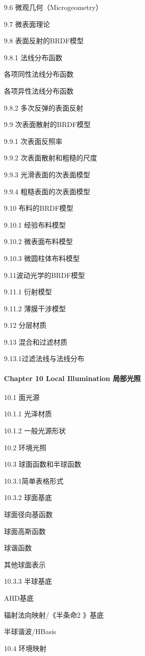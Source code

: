 \documentclass[
  paper=a4,
  ,captions=tableheading
]{scrartcl}
\begin{document}
9.6 微观几何（Microgeometry）

9.7 微表面理论

9.8 表面反射的BRDF模型

9.8.1 法线分布函数

各项同性法线分布函数

各项异性法线分布函数

9.8.2 多次反弹的表面反射

9.9 次表面散射的BRDF模型

9.9.1 次表面反照率

9.9.2 次表面散射和粗糙的尺度

9.9.3 光滑表面的次表面模型

9.9.4 粗糙表面的次表面模型

9.10 布料的BRDF模型

9.10.1 经验布料模型

9.10.2 微表面布料模型

9.10.3 微圆柱体布料模型

9.11波动光学的BRDF模型

9.11.1 衍射模型

9.11.2 薄膜干涉模型

9.12 分层材质

9.13 混合和过滤材质

9.13.1过滤法线与法线分布

\paragraph{Chapter 10 Local Illumination
局部光照}\label{chapter-10-local-illumination-ux5c40ux90e8ux5149ux7167}

10.1 面光源

10.1.1 光泽材质

10.1.2 一般光源形状

10.2 环境光照

10.3 球面函数和半球函数

10.3.1简单表格形式

10.3.2 球面基底

球面径向基函数

球面高斯函数

球谐函数

其他球面表示

10.3.3 半球基底

AHD基底

辐射法向映射/《半条命2 》基底

半球谐波/HBasis

10.4 环境映射
\end{document}
